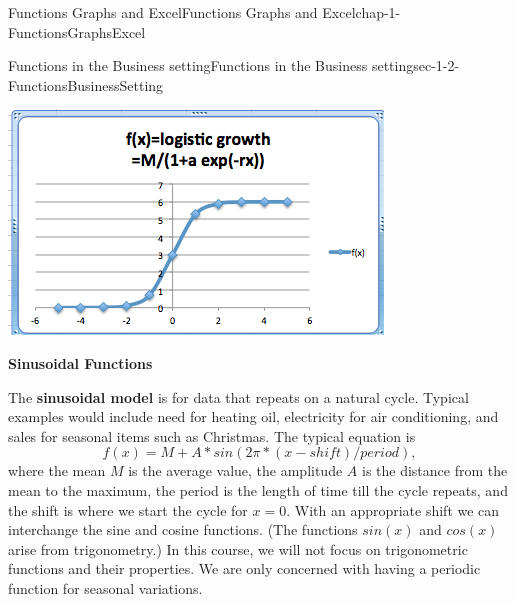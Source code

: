 \documentclass[oneside,10pt,]{book}
\newcommand{\terminology}[1]{\textbf{#1}}
\numberwithin{equation}{section}
\begin{document}
\begin{chapterptx}{Functions Graphs and Excel}{}{Functions Graphs and Excel}{}{}{chap-1-FunctionsGraphsExcel}
\begin{sectionptx}{Functions in the Business setting}{}{Functions in the Business setting}{}{}{sec-1-2-FunctionsBusinessSetting}
\begin{sidebyside}{1}{0.25}{0.25}{0}
\begin{sbspanel}{0.5}%
\includegraphics[width=1\linewidth]{images/sec1-2-LogisticFunction.png}
\end{sbspanel}%
\end{sidebyside}%
\par
\hypertarget{p-156}{}%
\terminology{Sinusoidal Functions}%
\par
\hypertarget{p-157}{}%
The \terminology{sinusoidal model} is for data that repeats on a natural cycle.  Typical examples would include need for heating oil, electricity for air conditioning, and sales for seasonal items such as Christmas.  The typical equation is%
%
\begin{equation*}
f(x)=M+A*sin(2\pi*(x-shift)/period),
\end{equation*}
\hypertarget{p-158}{}%
where the mean \(M\) is the average value, the amplitude \(A\) is the distance from the mean to the maximum, the period is the length of time till the cycle repeats, and the shift is where we start the cycle for \(x=0\). With an appropriate shift we can interchange the sine and cosine functions.  (The functions \(sin(x)\) and \(cos(x)\) arise from trigonometry.)  In this course, we will not focus on trigonometric functions and their properties.  We are only concerned with having a periodic function for seasonal variations.%
\begin{sidebyside}{1}{0.25}{0.25}{0}%
\begin{sbspanel}{0.5}%

\end{sbspanel}
\end{sidebyside}
\end{sectionptx}
\end{chapterptx}
\end{document}
